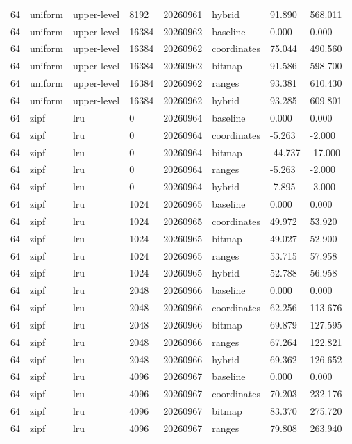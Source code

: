 \begin{tabular}{llllllll}
64 & uniform & upper-level & 8192 & 20260961 & hybrid & 91.890 & 568.011 \\
64 & uniform & upper-level & 16384 & 20260962 & baseline & 0.000 & 0.000 \\
64 & uniform & upper-level & 16384 & 20260962 & coordinates & 75.044 & 490.560 \\
64 & uniform & upper-level & 16384 & 20260962 & bitmap & 91.586 & 598.700 \\
64 & uniform & upper-level & 16384 & 20260962 & ranges & 93.381 & 610.430 \\
64 & uniform & upper-level & 16384 & 20260962 & hybrid & 93.285 & 609.801 \\
64 & zipf & lru & 0 & 20260964 & baseline & 0.000 & 0.000 \\
64 & zipf & lru & 0 & 20260964 & coordinates & -5.263 & -2.000 \\
64 & zipf & lru & 0 & 20260964 & bitmap & -44.737 & -17.000 \\
64 & zipf & lru & 0 & 20260964 & ranges & -5.263 & -2.000 \\
64 & zipf & lru & 0 & 20260964 & hybrid & -7.895 & -3.000 \\
64 & zipf & lru & 1024 & 20260965 & baseline & 0.000 & 0.000 \\
64 & zipf & lru & 1024 & 20260965 & coordinates & 49.972 & 53.920 \\
64 & zipf & lru & 1024 & 20260965 & bitmap & 49.027 & 52.900 \\
64 & zipf & lru & 1024 & 20260965 & ranges & 53.715 & 57.958 \\
64 & zipf & lru & 1024 & 20260965 & hybrid & 52.788 & 56.958 \\
64 & zipf & lru & 2048 & 20260966 & baseline & 0.000 & 0.000 \\
64 & zipf & lru & 2048 & 20260966 & coordinates & 62.256 & 113.676 \\
64 & zipf & lru & 2048 & 20260966 & bitmap & 69.879 & 127.595 \\
64 & zipf & lru & 2048 & 20260966 & ranges & 67.264 & 122.821 \\
64 & zipf & lru & 2048 & 20260966 & hybrid & 69.362 & 126.652 \\
64 & zipf & lru & 4096 & 20260967 & baseline & 0.000 & 0.000 \\
64 & zipf & lru & 4096 & 20260967 & coordinates & 70.203 & 232.176 \\
64 & zipf & lru & 4096 & 20260967 & bitmap & 83.370 & 275.720 \\
64 & zipf & lru & 4096 & 20260967 & ranges & 79.808 & 263.940 \\

\end{tabular}
